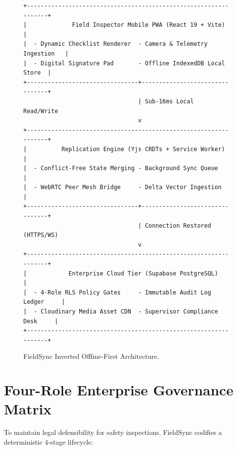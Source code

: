 \documentclass[12pt,a4paper]{report}
\begin{document}
\begin{figure}[htbp]
\centering
\footnotesize
\begin{verbatim}
+-----------------------------------------------------------------+
|             Field Inspector Mobile PWA (React 19 + Vite)        |
|  - Dynamic Checklist Renderer  - Camera & Telemetry Ingestion   |
|  - Digital Signature Pad       - Offline IndexedDB Local Store  |
+--------------------------------+--------------------------------+
                                 | Sub-16ms Local Read/Write
                                 v
+-----------------------------------------------------------------+
|          Replication Engine (Yjs CRDTs + Service Worker)         |
|  - Conflict-Free State Merging - Background Sync Queue          |
|  - WebRTC Peer Mesh Bridge     - Delta Vector Ingestion         |
+--------------------------------+--------------------------------+
                                 | Connection Restored (HTTPS/WS)
                                 v
+-----------------------------------------------------------------+
|            Enterprise Cloud Tier (Supabase PostgreSQL)          |
|  - 4-Role RLS Policy Gates     - Immutable Audit Log Ledger     |
|  - Cloudinary Media Asset CDN  - Supervisor Compliance Desk     |
+-----------------------------------------------------------------+
\end{verbatim}
\caption{FieldSync Inverted Offline-First Architecture.}
\label{fig:fieldsync_topology}
\end{figure}

\section{Four-Role Enterprise Governance Matrix}
To maintain legal defensibility for safety inspections, FieldSync codifies a deterministic 4-stage lifecycle:
\end{document}
